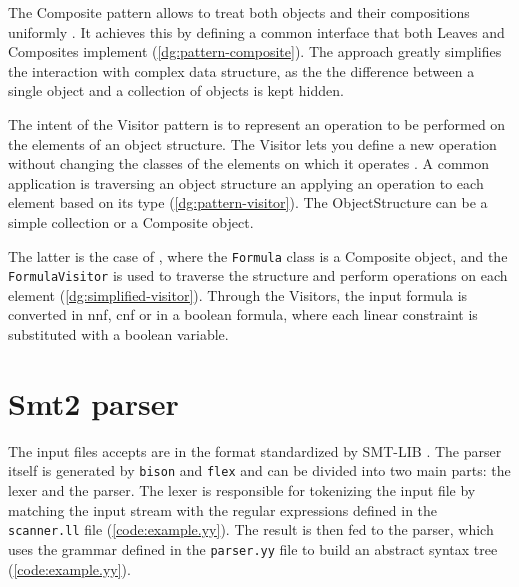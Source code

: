 The Composite pattern allows to treat both objects and their compositions uniformly \cite{book:gof}.
It achieves this by defining a common interface that both Leaves and Composites implement (\autoref{dg:pattern-composite}).
The approach greatly simplifies the interaction with complex data structure, as the the difference between a single object and a collection of objects is kept hidden.


The intent of the Visitor pattern is to represent an operation to be performed on the elements of an object structure.
The Visitor lets you define a new operation without changing the classes of the elements on which it operates \cite{book:gof}.
A common application is traversing an object structure an applying an operation to each element based on its type (\autoref{dg:pattern-visitor}).
The ObjectStructure can be a simple collection or a Composite object.


The latter is the case of \dlinear, where the \texttt{Formula} class is a Composite object, and the \texttt{FormulaVisitor} is used to traverse the structure and perform operations on each element (\autoref{dg:simplified-visitor}).
Through the Visitors, the input formula is converted in \gls{nnf}, \gls{cnf} or in a boolean formula, where each linear constraint is substituted with a boolean variable.


\section{Smt2 parser}

The input files \dlinear accepts are in the format standardized by SMT-LIB \cite{docs:smtlib}.
The parser itself is generated by \texttt{bison} and \texttt{flex} and can be divided into two main parts: the lexer and the parser.
The lexer is responsible for tokenizing the input file by matching the input stream with the regular expressions defined in the \texttt{scanner.ll} file (\autoref{code:example.yy}).
The result is then fed to the parser, which uses the grammar defined in the \texttt{parser.yy} file to build an abstract syntax tree (\autoref{code:example.yy}).

